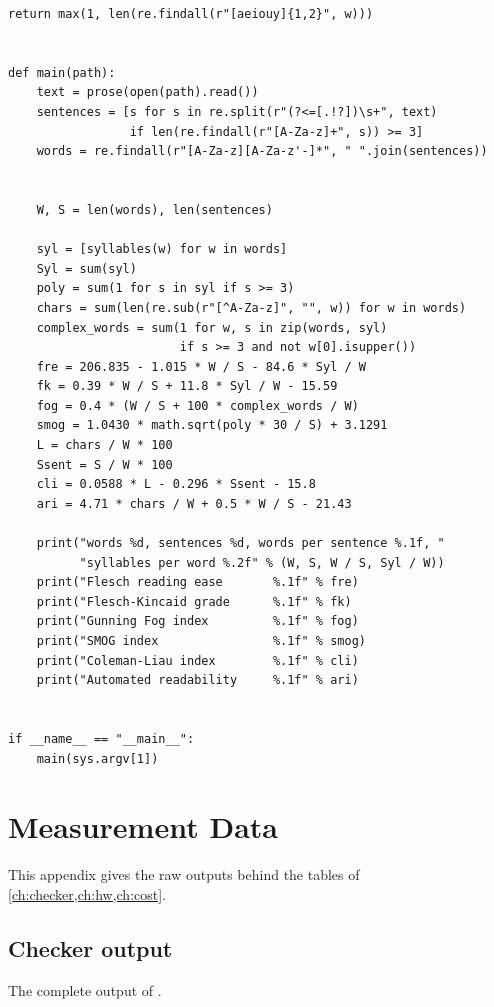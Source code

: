 \begin{lstlisting}[style=vspython]
    return max(1, len(re.findall(r"[aeiouy]{1,2}", w)))


def main(path):
    text = prose(open(path).read())
    sentences = [s for s in re.split(r"(?<=[.!?])\s+", text)
                 if len(re.findall(r"[A-Za-z]+", s)) >= 3]
    words = re.findall(r"[A-Za-z][A-Za-z'-]*", " ".join(sentences))


    W, S = len(words), len(sentences)
    
    syl = [syllables(w) for w in words]
    Syl = sum(syl)
    poly = sum(1 for s in syl if s >= 3)
    chars = sum(len(re.sub(r"[^A-Za-z]", "", w)) for w in words)
    complex_words = sum(1 for w, s in zip(words, syl)
                        if s >= 3 and not w[0].isupper())
    fre = 206.835 - 1.015 * W / S - 84.6 * Syl / W
    fk = 0.39 * W / S + 11.8 * Syl / W - 15.59
    fog = 0.4 * (W / S + 100 * complex_words / W)
    smog = 1.0430 * math.sqrt(poly * 30 / S) + 3.1291
    L = chars / W * 100
    Ssent = S / W * 100
    cli = 0.0588 * L - 0.296 * Ssent - 15.8
    ari = 4.71 * chars / W + 0.5 * W / S - 21.43

    print("words %d, sentences %d, words per sentence %.1f, "
          "syllables per word %.2f" % (W, S, W / S, Syl / W))
    print("Flesch reading ease       %.1f" % fre)
    print("Flesch-Kincaid grade      %.1f" % fk)
    print("Gunning Fog index         %.1f" % fog)
    print("SMOG index                %.1f" % smog)
    print("Coleman-Liau index        %.1f" % cli)
    print("Automated readability     %.1f" % ari)


if __name__ == "__main__":
    main(sys.argv[1])
\end{lstlisting}

\chapter{Measurement Data}
\label{app:data}

This appendix gives the raw outputs behind the tables of \cref{ch:checker,ch:hw,ch:cost}.

\section{Checker output}
The complete output of .

